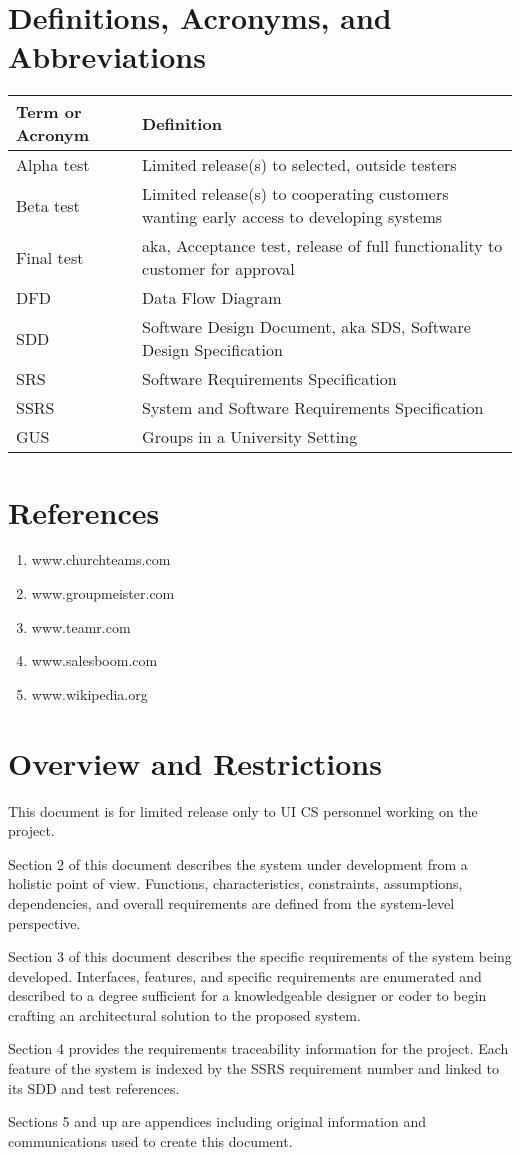 	\section{Definitions, Acronyms, and Abbreviations}
		\begin{tabular}{|p{4cm}|p{10cm}|}
		\hline
		\textbf{Term or Acronym} & \textbf{Definition} \\ \hline
		Alpha test & Limited release(s) to selected, outside testers \\ \hline
		Beta test & Limited release(s) to cooperating customers wanting early access to developing systems \\ \hline
		Final test & aka, Acceptance test, release of full functionality to customer for approval \\ \hline
		DFD & Data Flow Diagram \\ \hline
		SDD & Software Design Document, aka SDS, Software Design Specification \\ \hline
		SRS &  Software Requirements Specification \\ \hline
		SSRS & System and Software Requirements Specification \\ \hline
		GUS & Groups in a University Setting \\ \hline
		\end{tabular}
	\section{References}
		\begin{enumerate}
			\item www.churchteams.com
			\item www.groupmeister.com
			\item www.teamr.com
			\item www.salesboom.com
			\item www.wikipedia.org
		\end{enumerate}
	\section{Overview and Restrictions}

	This document is for limited release only to UI CS personnel
	working on the project.

		Section 2 of this document describes the system under development
		from a holistic point of view.  Functions, characteristics,
		constraints, assumptions, dependencies, and overall requirements
		are defined from the system-level perspective.

		Section 3 of this document describes the specific requirements of
		the system being developed.  Interfaces, features, and specific
		requirements are enumerated and described to a degree sufficient
		for a knowledgeable designer or coder to begin crafting an
		architectural solution to the proposed system.

		Section 4 provides the requirements traceability information for
		the project.  Each feature of the system is indexed by the SSRS
		requirement number and linked to its SDD and test references.

		Sections 5 and up are appendices including original information
		and communications used to create this document.

